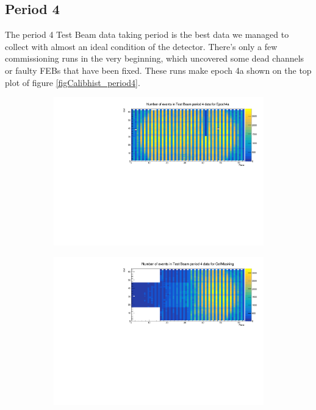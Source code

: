 \documentclass[12pt,a4paper]{article}
\begin{document}
\subsection{Period 4}\label{secTBPeriod4}

The period 4 Test Beam data taking period is the best data we managed to collect with almost an ideal condition of the detector. There's only a few commissioning runs in the very beginning, which uncovered some dead channels or faulty FEBs that have been fixed. These runs make epoch 4a shown on the top plot of figure \ref{figCalibhist_period4}.

\begin{figure}[!hbtp]
\centering
\begin{subfigure}[b]{\textwidth}
\centering
\includegraphics[width=.9\textwidth]{Plots/Attenprofs_P4Data_CellPlane_Epoch4a.pdf}
\end{subfigure}
\begin{subfigure}[b]{\textwidth}
\centering
\includegraphics[width=.9\textwidth]{Plots/Attenprofs_P4Data_CellPlane_CellMasking.pdf}

\end{subfigure}
\end{figure}
\end{document}
